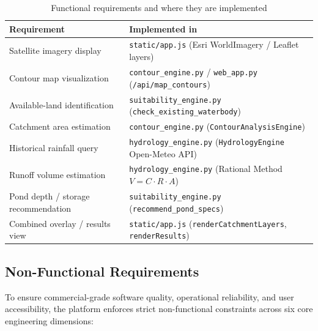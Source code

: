 \documentclass[manuscript,screen,review]{acmart}
\begin{document}
\begin{table}[h]
  \caption{Functional requirements and where they are implemented}
  \label{tab:requirements}
  \begin{tabular}{p{5.5cm}p{7.5cm}}
    \toprule
    Requirement & Implemented in \\
    \midrule
    Satellite imagery display & \texttt{static/app.js} (Esri WorldImagery / Leaflet layers) \\
    Contour map visualization & \texttt{contour\_engine.py} / \texttt{web\_app.py} (\texttt{/api/map\_contours}) \\
    Available-land identification & \texttt{suitability\_engine.py} (\texttt{check\_existing\_waterbody}) \\
    Catchment area estimation & \texttt{contour\_engine.py} (\texttt{ContourAnalysisEngine}) \\
    Historical rainfall query & \texttt{hydrology\_engine.py} (\texttt{HydrologyEngine} Open-Meteo API) \\
    Runoff volume estimation & \texttt{hydrology\_engine.py} (Rational Method $V = C \cdot R \cdot A$) \\
    Pond depth / storage recommendation & \texttt{suitability\_engine.py} (\texttt{recommend\_pond\_specs}) \\
    Combined overlay / results view & \texttt{static/app.js} (\texttt{renderCatchmentLayers}, \texttt{renderResults}) \\
    \bottomrule
  \end{tabular}
\end{table}

\subsection{Non-Functional Requirements}
To ensure commercial-grade software quality, operational reliability, and user accessibility, the platform enforces strict non-functional constraints across six core engineering dimensions:
\end{document}
